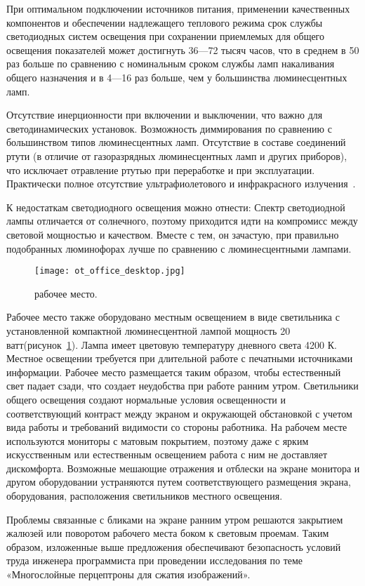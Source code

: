 При оптимальном подключении источников питания, применении качественных компонентов и обеспечении надлежащего теплового режима срок службы светодиодных систем освещения при сохранении приемлемых для общего освещения показателей может достигнуть 36—72 тысяч часов, что в среднем в 50 раз больше по сравнению с номинальным сроком службы ламп накаливания общего назначения и в 4—16 раз больше, чем у большинства люминесцентных ламп.

Отсутствие инерционности при включении и выключении, что важно для светодинамических установок.
Возможность диммирования по сравнению с большинством типов люминесцентных ламп.
Отсутствие в составе соединений ртути (в отличие от газоразрядных люминесцентных ламп и других приборов), что исключает отравление ртутью при переработке и при эксплуатации.
Практически полное отсутствие ультрафиолетового и инфракрасного излучения~\cite{ot_russia_encyclopedia}.

К недостаткам светодиодного освещения можно отнести: Спектр светодиодной лампы отличается от солнечного, поэтому приходится идти на компромисс между световой мощностью и качеством. Вместе с тем, он зачастую, при правильно подобранных люминофорах лучше по сравнению с люминесцентными лампами.

\begin{figure}[ht]
\centering
  \texttt{[image: ot\_office\_desktop.jpg]}
  \caption{ рабочее место. }
  \label{fig:office_desktop}
\end{figure}

Рабочее место также оборудовано местным освещением в виде светильника с установленной компактной люминесцентной лампой мощность 20 ватт(рисунок~\ref{fig:office_desktop}).
Лампа имеет цветовую температуру дневного света 4200 К.
Местное освещении требуется при длительной работе с печатными источниками информации.
Рабочее место размещается таким образом, чтобы естественный свет падает сзади, что создает неудобства при работе ранним утром.
Светильники общего освещения создают нормальные условия освещенности и соответствующий контраст между экраном и окружающей обстановкой с учетом вида работы и требований видимости со стороны работника.
На рабочем месте используются мониторы с матовым покрытием, поэтому даже с ярким искусственным или естественным освещением работа с ним не доставляет дискомфорта.
Возможные мешающие отражения и отблески на экране монитора и другом оборудовании устраняются путем соответствующего размещения экрана, оборудования, расположения светильников местного освещения.

Проблемы связанные с бликами на экране ранним утром решаются закрытием жалюзей или поворотом рабочего места боком к световым проемам.
Таким образом, изложенные выше предложения обеспечивают безопасность условий труда инженера программиста при проведении исследования по теме «Многослойные перцептроны для сжатия изображений».
